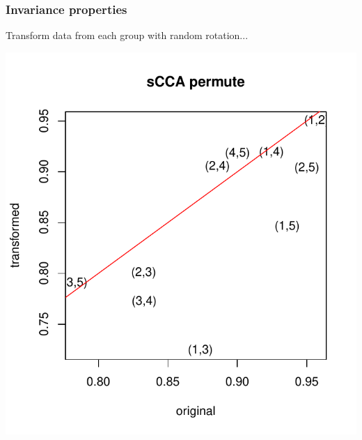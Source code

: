 \documentclass{beamer}
\begin{document}
\begin{frame}
\frametitle{Invariance properties}
Transform data from each group with random rotation...\pause

\begin{center}
\includegraphics[scale = 0.5]{../idloss/cca_p_robustness.pdf}
\end{center}
\end{frame}
\end{document}
